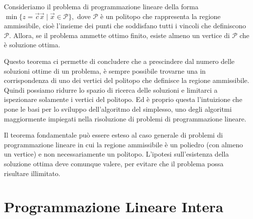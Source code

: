 \begin{LPTheorem}
Consideriamo il problema di programmazione lineare della
forma
\(
    \min \{ z = \vec{c}\vec{x} \mid
    \vec{x} \in \mathcal{P} \},
\)
dove $\mathcal{P}$ è un politopo che rappresenta la regione ammissibile,
cioè l'insieme dei punti che soddisfano tutti i vincoli che definiscono
$\mathcal{P}$. Allora, se il problema ammette ottimo finito, esiste almeno
un vertice di $\mathcal{P}$ che è soluzione ottima.
\end{LPTheorem}
Questo teorema ci permette di concludere che a prescindere dal numero delle
soluzioni ottime di un problema, è sempre possibile trovarne una in
corrispondenza di uno dei vertici del politopo che definisce la regione
ammissibile. Quindi possiamo ridurre lo spazio di ricerca delle soluzioni e
limitarci a ispezionare solamente i vertici del politopo. Ed è proprio
questa l'intuizione che pone le basi per lo sviluppo dell'algoritmo del
simplesso, uno degli algoritmi maggiormente impiegati nella risoluzione di
problemi di programmazione lineare.

Il teorema fondamentale può essere esteso al caso generale di problemi di
programmazione lineare in cui la regione ammissibile è un poliedro (con
almeno un vertice) e non necessariamente un politopo. L'ipotesi
sull'esistenza della soluzione ottima deve comunque valere, per evitare che
il problema possa risultare illimitato.

\section{Programmazione Lineare Intera}

